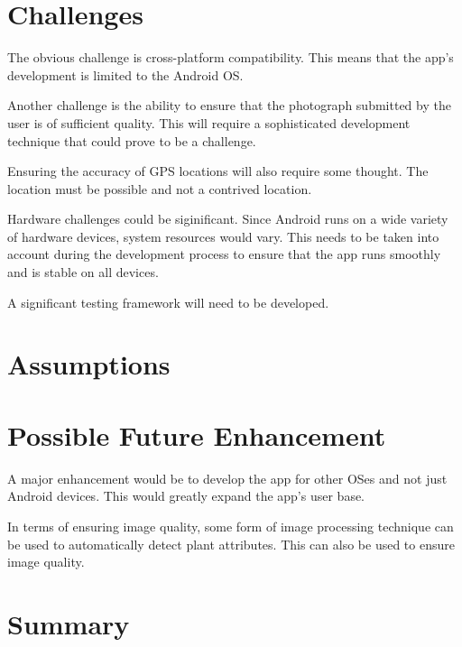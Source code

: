 \documentclass[12pt,a4paper,oneside]{article}
\begin{document}
\section{Challenges}
  \begin{spacing}{1.4}
    The obvious challenge is cross-platform compatibility. This means that the app's development is limited to the Android OS.

    Another challenge is the ability to ensure that the photograph submitted by the user is of sufficient quality. This will require a sophisticated development technique that could prove to be a challenge.

    Ensuring the accuracy of GPS locations will also require some thought. The location must be possible and not a contrived location.

    Hardware challenges could be siginificant. Since Android runs on a wide variety of hardware devices, system resources would vary. This needs to be taken into account during the development process to ensure that the app runs smoothly and is stable on all devices.

    A significant testing framework will need to be developed.
  \end{spacing}
\section{Assumptions}
\section{Possible Future Enhancement}
  \begin{spacing}{1.4}
    A major enhancement would be to develop the app for other OSes and not just Android devices. This would greatly expand the app's user base.

    In terms of ensuring image quality, some form of image processing technique can be used to automatically detect plant attributes. This can also be used to ensure image quality.
  \end{spacing}
\section{Summary}
\end{document}
